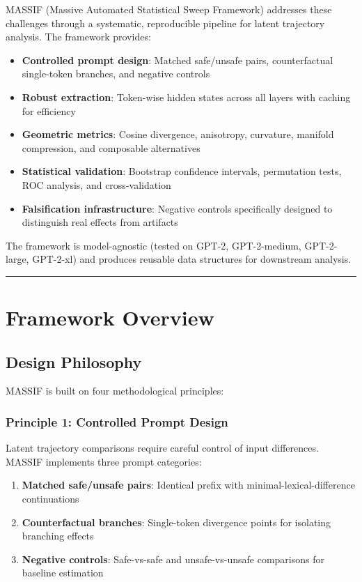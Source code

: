 \documentclass[12pt,a4paper]{article}
\begin{document}
MASSIF (Massive Automated Statistical Sweep Framework) addresses these challenges through a systematic, reproducible pipeline for latent trajectory analysis. The framework provides:

\begin{itemize}
    \item \textbf{Controlled prompt design}: Matched safe/unsafe pairs, counterfactual single-token branches, and negative controls
    \item \textbf{Robust extraction}: Token-wise hidden states across all layers with caching for efficiency
    \item \textbf{Geometric metrics}: Cosine divergence, anisotropy, curvature, manifold compression, and composable alternatives
    \item \textbf{Statistical validation}: Bootstrap confidence intervals, permutation tests, ROC analysis, and cross-validation
    \item \textbf{Falsification infrastructure}: Negative controls specifically designed to distinguish real effects from artifacts
\end{itemize}

The framework is model-agnostic (tested on GPT-2, GPT-2-medium, GPT-2-large, GPT-2-xl) and produces reusable data structures for downstream analysis.

\medskip
\hrule
\medskip

\section{Framework Overview}

\subsection{Design Philosophy}

MASSIF is built on four methodological principles:

\subsubsection*{Principle 1: Controlled Prompt Design}

Latent trajectory comparisons require careful control of input differences. MASSIF implements three prompt categories:

\begin{enumerate}
    \item \textbf{Matched safe/unsafe pairs}: Identical prefix with minimal-lexical-difference continuations
    \item \textbf{Counterfactual branches}: Single-token divergence points for isolating branching effects
    \item \textbf{Negative controls}: Safe-vs-safe and unsafe-vs-unsafe comparisons for baseline estimation
\end{enumerate}
\end{document}
